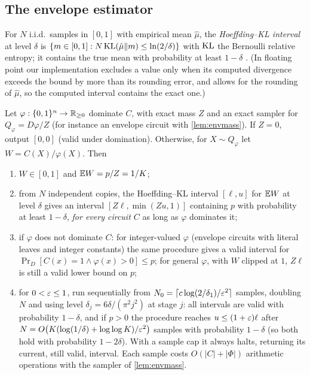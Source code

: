 \subsection{The envelope estimator}

For $N$ i.i.d.\ samples in $[0,1]$ with empirical mean $\hat\mu$, the
\emph{Hoeffding--KL interval} at level $\delta$ is
$\{m\in[0,1]:N\,\mathrm{KL}(\hat\mu\|m)\le\ln(2/\delta)\}$ with $\mathrm{KL}$ the Bernoulli relative
entropy; it contains the true mean with probability at least $1-\delta$
\cite[Thm.~1]{hoeffding1963}. (In floating point our implementation excludes a value
only when its computed divergence exceeds the bound by more than its rounding error,
and allows for the rounding of $\hat\mu$, so the computed interval contains the exact
one.)

\begin{theorem}\label{thm:envelope}
Let $\varphi:\{0,1\}^n\to\mathbb{R}_{\ge0}$ dominate $C$, with exact mass $Z$ and an exact
sampler for $Q_\varphi=D\varphi/Z$ (for instance an envelope circuit with
\cref{lem:envmass}). If $Z=0$, output $[0,0]$ (valid under domination). Otherwise,
for $X\sim Q_\varphi$ let $W=C(X)/\varphi(X)$. Then
\begin{enumerate}[label=(\roman*)]
\item $W\in[0,1]$ and $\mathbb{E} W=p/Z=1/K$;
\item from $N$ independent copies, the Hoeffding--KL interval $[\ell,u]$ for
$\mathbb{E} W$ at level $\delta$ gives an interval $[Z\ell,\min(Zu,1)]$ containing $p$ with
probability at least $1-\delta$, \emph{for every circuit $C$} as long as $\varphi$
dominates it;
\item if $\varphi$ does not dominate $C$: for integer-valued $\varphi$ (envelope
circuits with literal leaves and integer constants) the same procedure gives a
valid interval for $\Pr_D[C(x)=1\wedge\varphi(x)>0]\le p$; for general $\varphi$, with
$W$ clipped at $1$, $Z\ell$ is still a valid lower bound on $p$;
\item for $0<\varepsilon\le1$, run sequentially from
$N_0=\lceil c\log(2/\delta_1)/\varepsilon^2\rceil$ samples, doubling $N$ and using level
$\delta_j=6\delta/(\pi^2j^2)$ at stage $j$: all intervals are valid with probability
$1-\delta$, and if $p>0$ the procedure reaches $u\le(1+\varepsilon)\ell$ after
$N=O\big(K(\log(1/\delta)+\log\log K)/\varepsilon^2\big)$ samples with probability $1-\delta$
(so both hold with probability $1-2\delta$). With a sample cap it always halts,
returning its current, still valid, interval. Each sample costs $O(|C|+|\Phi|)$
arithmetic operations with the sampler of \cref{lem:envmass}.
\end{enumerate}
\end{theorem}

